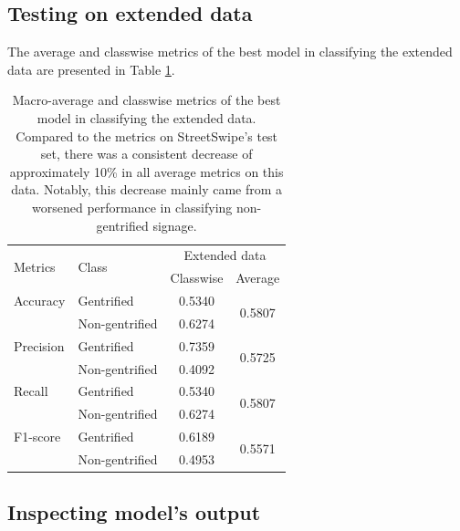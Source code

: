 \subsection{Testing on extended data}
The average and classwise metrics of the best model in classifying the extended data are presented in Table \ref{fig:resnet50_pano}.

{
\setlength\intextsep{2.65pt}
\begin{table}[h!]
\begin{tabular}{llcc}
\toprule
\multirow{2}{*}{Metrics}   & \multirow{2}{*}{Class} & \multicolumn{2}{c}{Extended data}   \\ \cline{3-4} 
                           &                        & Classwise & Average                 \\ \hline
Accuracy                   & Gentrified             & 0.5340    & \multirow{2}{*}{0.5807} \\
                           & Non-gentrified         & 0.6274    &                         \\
Precision                  & Gentrified             & 0.7359    & \multirow{2}{*}{0.5725} \\
                           & Non-gentrified         & 0.4092    &                         \\
Recall                     & Gentrified             & 0.5340    & \multirow{2}{*}{0.5807} \\
                           & Non-gentrified         & 0.6274    &                         \\
F1-score                   & Gentrified             & 0.6189    & \multirow{2}{*}{0.5571} \\
                           & Non-gentrified         & 0.4953    &                         \\
\bottomrule
\end{tabular}
\caption{Macro-average and classwise metrics of the best model in classifying the extended data. Compared to the metrics on StreetSwipe's test set, there was a consistent decrease of approximately 10\% in all average metrics on this data. Notably, this decrease mainly came from a worsened performance in classifying non-gentrified signage.}
\label{fig:resnet50_pano}
\end{table}
}

\subsection{Inspecting model's output}

